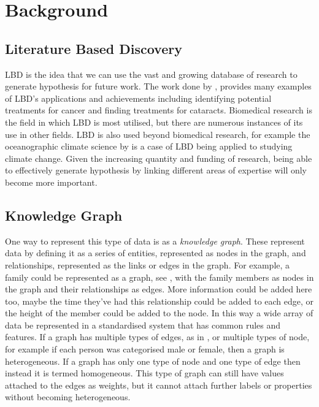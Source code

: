 \documentclass{l4proj}
\begin{document}
\chapter{Background}

\section{Literature Based Discovery}

LBD is the idea that we can use the vast and growing database of research to generate hypothesis for future work. The work done by \cite{henry_literature_2017}, provides many examples of LBD's applications and achievements including identifying potential treatments for cancer and finding treatments for cataracts. Biomedical research is the field in which LBD is most utilised, but there are numerous instances of its use in other fields. LBD is also used beyond biomedical research, for example the oceanographic climate science by \cite{aamot_literature-based_2014} is a case of LBD being applied to  studying climate change. Given the increasing quantity and funding of research, being able to effectively generate hypothesis by linking different areas of expertise will only become more important.\\  

\section{Knowledge Graph}

One way to represent this type of data is as a \textit{knowledge graph}. These represent data by defining it as a series of entities, represented as nodes in the graph, and relationships, represented as the links or edges in the graph. For example, a family could be represented as a graph, see , with the family members as nodes in the graph and their relationships as edges. More information could be added here too, maybe the time they've had this relationship could be added to each edge, or the height of the member could be added to the node. In this way a wide array of data be represented in a standardised system that has common rules and features. If a graph has multiple types of edges, as in , or multiple types of node, for example if each person was categorised male or female, then a graph is heterogeneous. If a graph has only one type of node and one type of edge then instead it is termed homogeneous. This type of graph can still have values attached to the edges as weights, but it cannot attach further labels or properties without becoming heterogeneous. \\ 
\end{document}
